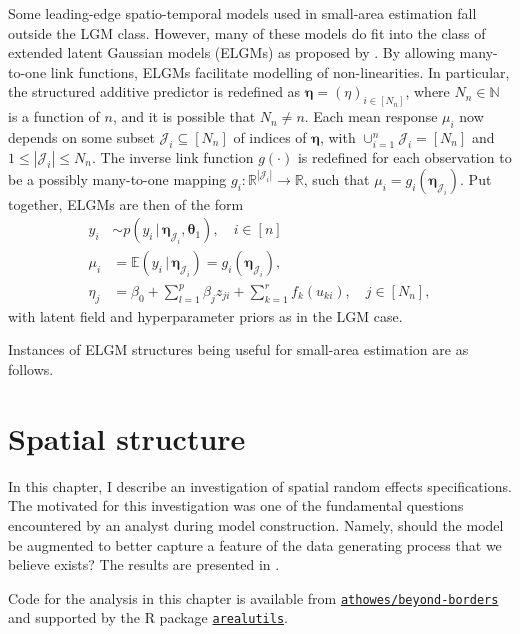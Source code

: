 \documentclass[a4paper, nobind]{templates/ociamthesis}
\newcommand{\btheta}{\bm{\theta}}
\newcommand{\bmeta}{\bm{\eta}}
\begin{document}
Some leading-edge spatio-temporal models used in small-area estimation fall outside the LGM class.
However, many of these models do fit into the class of extended latent Gaussian models (ELGMs) as proposed by \textcite{stringer2021fast}.
By allowing many-to-one link functions, ELGMs facilitate modelling of non-linearities.
In particular, the structured additive predictor is redefined as \(\bmeta = (\eta)_{i \in [N_n]}\), where \(N_n \in \mathbb{N}\) is a function of \(n\), and it is possible that \(N_n \neq n\).
Each mean response \(\mu_i\) now depends on some subset \(\mathcal{J}_i \subseteq [N_n]\) of indices of \(\bmeta\), with \(\cup_{i = 1}^n \mathcal{J}_i = [N_n]\) and \(1 \leq |\mathcal{J}_i| \leq N_n\).
The inverse link function \(g(\cdot)\) is redefined for each observation to be a possibly many-to-one mapping \(g_i: \mathbb{R}^{|\mathcal{J}_i|} \to \mathbb{R}\), such that \(\mu_i = g_i(\bmeta_{\mathcal{J}_i})\).
Put together, ELGMs are then of the form
\begin{align*}
y_i &\sim p(y_i \, | \, \bmeta_{\mathcal{J}_i}, \btheta_1), \quad i \in [n] \\
\mu_i &= \mathbb{E}(y_i \, | \, \bmeta_{\mathcal{J}_i}) = g_i(\bmeta_{\mathcal{J}_i}), \\
\eta_j &= \beta_0 + \sum_{l = 1}^{p} \beta_j z_{ji} + \sum_{k = 1}^{r} f_k(u_{ki}), \quad j \in [N_n],
\end{align*}
with latent field and hyperparameter priors as in the LGM case.

Instances of ELGM structures being useful for small-area estimation are as follows.

\hypertarget{beyond-borders}{%
\chapter{Spatial structure}\label{beyond-borders}}

\adjustmtc
{}

In this chapter, I describe an investigation of spatial random effects specifications.
The motivated for this investigation was one of the fundamental questions encountered by an analyst during model construction.
Namely, should the model be augmented to better capture a feature of the data generating process that we believe exists?
The results are presented in \textcite{howes2023beyond}.

Code for the analysis in this chapter is available from \href{https://github.com/athowes/beyond-borders}{\texttt{athowes/beyond-borders}} and supported by the R package \href{https://athowes.github.io/arealutils}{\texttt{arealutils}}.
\end{document}
